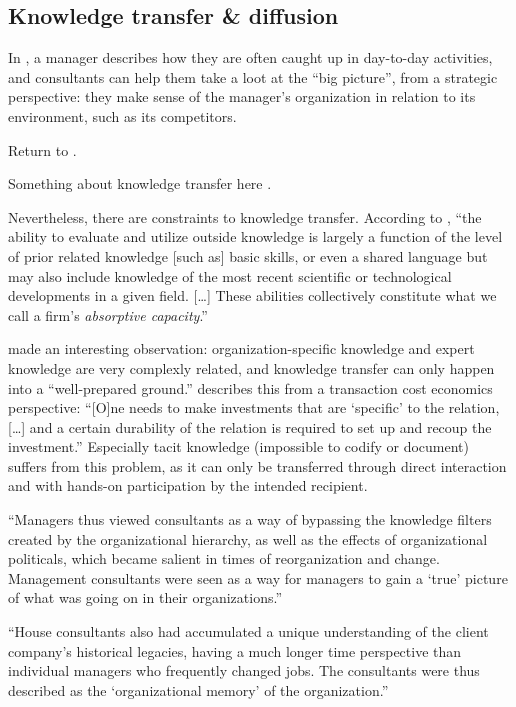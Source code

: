 \documentclass[12pt]{article}
\begin{document}
\hypertarget{knowledge-transfer-diffusion}{%
\subsection{Knowledge transfer \&
diffusion}\label{knowledge-transfer-diffusion}}

In \citet[53]{werr2002}, a manager describes how they are often caught
up in day-to-day activities, and consultants can help them take a loot
at the ``big picture'', from a strategic perspective: they make sense of
the manager's organization in relation to its environment, such as its
competitors.

Return to \citet{turner1982}.

Something about knowledge transfer here \citep{sturdy2009}.

Nevertheless, there are constraints to knowledge transfer. According to
\citet[128-129]{cohen1990}, ``the ability to evaluate and utilize
outside knowledge is largely a function of the level of prior related
knowledge {[}such as{]} basic skills, or even a shared language but may
also include knowledge of the most recent scientific or technological
developments in a given field. {[}\ldots{]} These abilities collectively
constitute what we call a firm's \emph{absorptive capacity}.''

\citet[84]{fincham2002} made an interesting observation:
organization-specific knowledge and expert knowledge are very complexly
related, and knowledge transfer can only happen into a ``well-prepared
ground.'' \citet[922]{nooteboom2000} describes this from a transaction
cost economics perspective: ``{[}O{]}ne needs to make investments that
are `specific' to the relation, {[}\ldots{]} and a certain durability of
the relation is required to set up and recoup the investment.''
Especially tacit knowledge (impossible to codify or document) suffers
from this problem, as it can only be transferred through direct
interaction and with hands-on participation by the intended recipient.

``Managers thus viewed consultants as a way of bypassing the knowledge
filters created by the organizational hierarchy, as well as the effects
of organizational politicals, which became salient in times of
reorganization and change. Management consultants were seen as a way for
managers to gain a `true' picture of what was going on in their
organizations.'' \citep[ 54]{werr2002}

``House consultants also had accumulated a unique understanding of the
client company's historical legacies, having a much longer time
perspective than individual managers who frequently changed jobs. The
consultants were thus described as the `organizational memory' of the
organization.''
\end{document}
